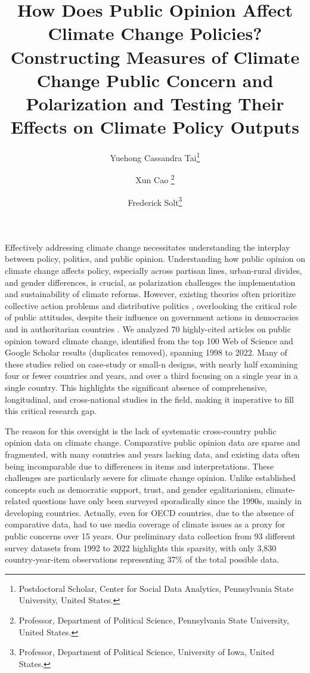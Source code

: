 \documentclass[11pt]{article}
\title{How Does Public Opinion Affect Climate Change Policies?
Constructing Measures of Climate Change Public Concern and Polarization and Testing Their Effects on Climate Policy Outputs
}
\author{Yuehong Cassandra Tai\thanks{Postdoctoral Scholar, Center for Social Data Analytics, Pennsylvania State University, United States.}%
\and Xun Cao \thanks{Professor, Department of Political Science, Pennsylvania State University, United States.}%
\and Frederick Solt\thanks{Professor, Department of Political Science, University of Iowa, United States.}%
}
\date{}
\begin{document}
\maketitle
\newpage
Effectively addressing climate change necessitates understanding the interplay between policy, politics, and public opinion. Understanding how public opinion on climate change affects policy, especially across partisan lines, urban-rural divides, and gender differences, is crucial, as polarization challenges the implementation and sustainability of climate reforms. However, existing theories often prioritize collective action problems \citep{ostrom1990governing,barrett2003environment,nordhaus2015climate,keohane2016cooperation} and distributive politics \citep{colgan2021asset,aklin2020prisoners}, overlooking the critical role of public attitudes, despite their influence on government actions in democracies \citep{dahl1971polyarchy,burstein2003impact} and in authoritarian countries \citep{alkon2018pollution}. We analyzed 70 highly-cited articles on public opinion toward climate change, identified from the top 100 Web of Science and Google Scholar results (duplicates removed), spanning 1998 to 2022. Many of these studies relied on case-study or small-n designs, with nearly half examining four or fewer countries and years, and over a third focusing on a single year in a single country. This highlights the significant absence of comprehensive, longitudinal, and cross-national studies in the field, making it imperative to fill this critical research gap.


The reason for this oversight is the lack of systematic cross-country public opinion data on climate change. Comparative public opinion data are sparse and fragmented, with many countries and years lacking data, and existing data often being incomparable due to differences in items and interpretations. These challenges are particularly severe for climate change opinion. Unlike established concepts such as democratic support, trust, and gender egalitarianism, climate-related questions have only been surveyed sporadically since the 1990s, mainly in developing countries. Actually, even for OECD countries, due to the absence of comparative data, \citet{schaffer2022policymakers} had to use media coverage of climate issues as a proxy for public concerns over 15 years. Our preliminary data collection from 93 different survey datasets from 1992 to 2022 highlights this sparsity, with only 3,830 country-year-item observations representing 37\% of the total possible data.
\end{document}
